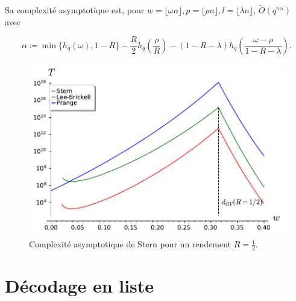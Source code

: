 \documentclass{scrartcl}[a4paper,9pt,headings=small,footinclude=false]
\theoremstyle{definition}
\theoremstyle{remark}
\begin{document}
Sa complexité asymptotique est, pour $w=\lfloor \omega n \rfloor, p = \lfloor \rho n \rfloor, l= \lfloor \lambda  n \rfloor$, $\tilde{O}(q^{n\alpha})$ avec

\[
	\alpha \coloneq \min\{ h_q(\omega), 1-R \} -\frac{R}{2} h_q(\frac{\rho}{R}) - (1-R-\lambda)h_q(\frac{\omega - \rho}{1 - R - \lambda}).
\]

\begin{figure}[h!]
\centering
\includegraphics{decodage_syndrome/Stern.pdf}
\caption{Complexité asymptotique de Stern pour un rendement $R=\frac{1}{2}$.}
\label{fig:prange}
\end{figure}

\newpage
\section{Décodage en liste}
\end{document}
